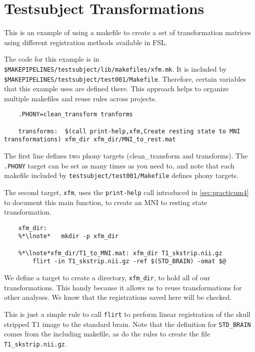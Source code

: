 \section{Testsubject Transformations}
\def\sectionautorefname{Testsubject Transformations}
\label{sec:testsubjectxfm}

This is an example of using a makefile to create a set of transformation matrices using different registration methods available in FSL. 

The code for this example is in \texttt{\$MAKEPIPELINES/testsubject/lib/makefiles/xfm.mk}. It is included by \texttt{\$MAKEPIPELINES/testsubject/test001/Makefile}. Therefore, certain variables that this example uses are defined there. This approach helps to organize multiple makefiles and reuse rules across projects.

\setcounter{codehighlight}{0} %
\begin{lstlisting}
	.PHONY=clean_transform tranforms 

	transforms:  $(call print-help,xfm,Create resting state to MNI transformations) xfm_dir xfm_dir/MNI_to_rest.mat
\end{lstlisting}

The first line defines two phony targets (clean\_transform and transforms). The \texttt{.PHONY} target can be set as many times as you need to, and note that each makefile included by \texttt{testsubject/test001/Makefile} defines phony targets. 

The second target, \texttt{xfm}, uses the \texttt{print-help} call introduced in \autoref{sec:practicum4} to document this main function, to create an MNI to resting state transformation.

\begin{lstlisting}
	xfm_dir:
	%*\lnote*	mkdir -p xfm_dir

	%*\lnote*xfm_dir/T1_to_MNI.mat: xfm_dir T1_skstrip.nii.gz 
		flirt -in T1_skstrip.nii.gz -ref $(STD_BRAIN) -omat $@
\end{lstlisting}

 We define a target to create a directory, \texttt{xfm_dir},
to hold all of our transformations. This handy because it allows us to
reuse transformations for other analyses. We know that
the registrations saved here will be checked. 

 This is just a simple rule to call \texttt{flirt} to perform
linear registration of the skull stripped T1 image to the standard
brain. Note that the definition for \texttt{STD_BRAIN} comes from the
including makefile, as do the rules to create the file \texttt{T1_skstrip.nii.gz}.


